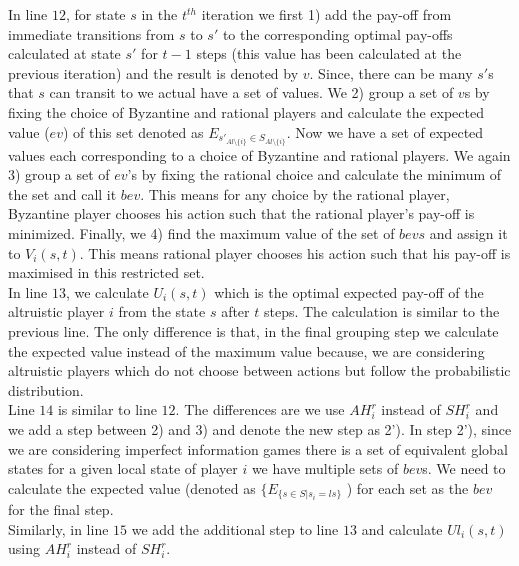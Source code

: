 In line $12$, for state $s$ in the $t^{th}$ iteration we first 1) add the pay-off from immediate transitions from $s$ to $s'$ to the corresponding optimal pay-offs calculated  at state $s'$ for $t-1$ steps (this value has been calculated at the previous iteration) and the result is denoted by $v$. Since, there can be many $s'$s that $s$ can transit to we actual have a set of values. We 2) group a set of $v$s by fixing the choice of Byzantine and rational players and calculate the expected value ($ev$) of this set denoted as $E_{s'_{Al \setminus \{i\}} \in S_{Al \setminus \{i\}}}$. Now we have a set of expected values each corresponding to a choice of Byzantine and rational players. We again 3) group a set of $ev$'s by fixing the rational choice and calculate the minimum of the set and call it $bev$. This means for any choice by the rational player, Byzantine player chooses his action such that the rational player's pay-off is minimized. Finally, we 4) find the maximum value of the set of $bevs$ and assign it to $V_i(s,t)$. This means rational player chooses his action such that his pay-off is maximised in this restricted set.\\
In line $13$, we calculate $U_i(s,t)$ which is the optimal expected pay-off of the altruistic player $i$ from the state $s$ after $t$ steps. The calculation is similar to the previous line. The only difference is that, in the final grouping step we calculate the expected value instead of the maximum value because, we are considering altruistic players which do not choose between actions but follow the probabilistic distribution.\\
Line $14$ is similar to line $12$. The differences are we use $AH_i^r$ instead of $SH_i^r$ and we add a step between 2) and 3) and denote the new step as 2'). In step 2'), since we are considering imperfect information games there is a set of equivalent global states for a given local state of player $i$ we have multiple sets of $bev$s. We need to calculate the expected value (denoted as $\{E_{\{s \in S | s_i=ls\}} $ ) for each set as the $bev$ for the final step.\\
Similarly, in line $15$ we add the additional step to line $13$ and calculate $Ul_i(s,t)$ using $AH_i^r$ instead of $SH_i^r$.\\

